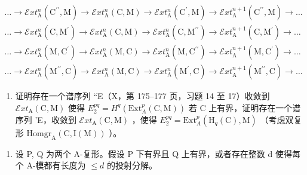 \[
\begin{array}{l} \dots \to \mathcal {E} x t _ {\mathrm{A}} ^ {n} (\mathrm{C} ^ {\prime \prime}, \mathrm{M}) \to \mathcal {E} x t _ {\mathrm{A}} ^ {n} (\mathrm{C}, \mathrm{M}) \to \mathcal {E} x t _ {\mathrm{A}} ^ {n} (\mathrm{C} ^ {\prime}, \mathrm{M}) \to \mathcal {E} x t _ {\mathrm{A}} ^ {n + 1} (\mathrm{C} ^ {\prime \prime}, \mathrm{M}) \to \dots \\ \dots \to \mathcal {E} x t _ {\mathrm{A}} ^ {n} (\mathrm{C}, \mathrm{M} ^ {\prime}) \to \mathcal {E} x t _ {\mathrm{A}} ^ {n} (\mathrm{C}, \mathrm{M}) \to \mathcal {E} x t _ {\mathrm{A}} ^ {n} (\mathrm{C}, \mathrm{M} ^ {\prime \prime}) \to \mathcal {E} x t _ {\mathrm{A}} ^ {n + 1} (\mathrm{C}, \mathrm{M} ^ {\prime}) \to \dots \\ \dots \to \mathcal {E} x t _ {\mathrm{A}} ^ {n} (\mathrm{M}, \mathrm{C} ^ {\prime}) \to \mathcal {E} x t _ {\mathrm{A}} ^ {n} (\mathrm{M}, \mathrm{C}) \to \mathcal {E} x t _ {\mathrm{A}} ^ {n} (\mathrm{M}, \mathrm{C} ^ {\prime \prime}) \to \mathcal {E} x t _ {\mathrm{A}} ^ {n + 1} (\mathrm{M}, \mathrm{C} ^ {\prime}) \to \dots \\ \dots \to \mathcal {E} x t _ {\mathrm{A}} ^ {n} (\mathrm{M} ^ {\prime \prime}, \mathrm{C}) \to \mathcal {E} x t _ {\mathrm{A}} ^ {n} (\mathrm{M}, \mathrm{C}) \to \mathcal {E} x t _ {\mathrm{A}} ^ {n} (\mathrm{M} ^ {\prime}, \mathrm{C}) \to \mathcal {E} x t _ {\mathrm{A}} ^ {n + 1} (\mathrm{M} ^ {\prime \prime}, \mathrm{C}) \to \dots \end{array}
\]

\begin{enumerate}
\def\labelenumi{\alph{enumi})}
\setcounter{enumi}{2}
\tightlist
\item
  证明存在一个谱序列 ``E（X，第 175–177 页，习题 14 至 17）收敛到 \(\mathcal{E}xt_{\mathrm{A}}(\mathrm{C},\mathrm{M})\) 使得 \(E_2^{pq} = H^q (\mathrm{Ext}_A^p (\mathrm{C},\mathrm{M}))\) 若 C 上有界，证明存在一个谱序列 'E，收敛到 \(\mathcal{E}xt_{\mathrm{A}}(\mathrm{C},\mathrm{M})\) ，使得 \(E_2^{pq} = \mathrm{Ext}_A^p (\mathrm{H}_q(\mathrm{C}),\mathrm{M})\) （考虑双复形 \(\mathrm{Homgr}_{\mathrm{A}}(\mathrm{C},\mathrm{I}(\mathrm{M}))\) ）。
\end{enumerate}

\begin{enumerate}
\def\labelenumi{\arabic{enumi})}
\setcounter{enumi}{7}
\tightlist
\item
  设 P, Q 为两个 A-复形。假设 P 下有界且 Q 上有界，或者存在整数 d 使得每个 A-模都有长度为 \(\leqslant d\) 的投射分解。
\end{enumerate}

